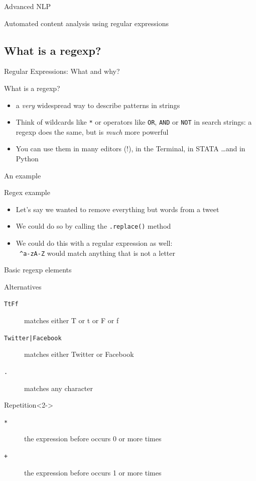 \documentclass[compress]{beamer}
\begin{document}
\begin{section}{Advanced NLP}
\begin{frame}
Automated content analysis using regular expressions
\end{frame}


\subsection{What is a regexp?}
\begin{frame}{Regular Expressions: What and why?}
\begin{block}{What is a regexp?}
\begin{itemize}
\item<1-> a \emph{very} widespread way to describe patterns in strings
\item<2-> Think of wildcards like {\tt{*}} or operators like {\tt{OR}}, {\tt{AND}} or {\tt{NOT}} in search strings: a regexp does the same, but is \emph{much} more powerful
\item<3-> You can use them in many editors (!), in the Terminal, in STATA \ldots and in Python
\end{itemize}
\end{block}
\end{frame}

\begin{frame}{An example}
\begin{block}{Regex example}
\begin{itemize}
\item Let's say we wanted to remove everything but words from a tweet
\item We could do so by calling the \texttt{.replace()} method
\item We could do this with a regular expression as well: \\
{\tt{ \lbrack \^{}a-zA-Z\rbrack}} would match anything that is not a letter
\end{itemize}
\end{block}
\end{frame}

\begin{frame}{Basic regexp elements}
\begin{block}{Alternatives}
\begin{description}
\item[{\tt{\lbrack TtFf\rbrack}}] matches either T or t or F or f
\item[{\tt{Twitter|Facebook}}] matches either Twitter or Facebook
\item[{\tt{.}}] matches any character
\end{description}
\end{block}
\begin{block}{Repetition}<2->
\begin{description}
\item[{\tt{*}}] the expression before occurs 0 or more times
\item[{\tt{+}}] the expression before occurs 1 or more times
\end{description}
\end{block}
\end{frame}


\end{section}
\end{document}
